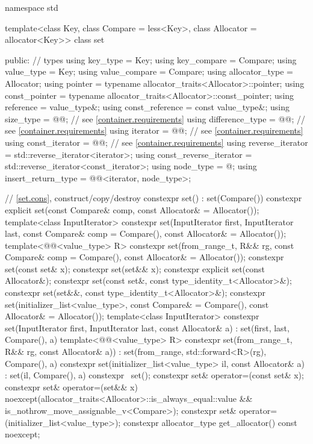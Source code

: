 \begin{codeblock}
namespace std {
  template<class Key, class Compare = less<Key>,
           class Allocator = allocator<Key>>
  class set {
  public:
    // types
    using key_type               = Key;
    using key_compare            = Compare;
    using value_type             = Key;
    using value_compare          = Compare;
    using allocator_type         = Allocator;
    using pointer                = typename allocator_traits<Allocator>::pointer;
    using const_pointer          = typename allocator_traits<Allocator>::const_pointer;
    using reference              = value_type&;
    using const_reference        = const value_type&;
    using size_type              = @@; // see \ref{container.requirements}
    using difference_type        = @@; // see \ref{container.requirements}
    using iterator               = @@; // see \ref{container.requirements}
    using const_iterator         = @@; // see \ref{container.requirements}
    using reverse_iterator       = std::reverse_iterator<iterator>;
    using const_reverse_iterator = std::reverse_iterator<const_iterator>;
    using node_type              = @\unspec@;
    using insert_return_type     = @@<iterator, node_type>;

    // \ref{set.cons}, construct/copy/destroy
    constexpr set() : set(Compare()) { }
    constexpr explicit set(const Compare& comp, const Allocator& = Allocator());
    template<class InputIterator>
      constexpr set(InputIterator first, InputIterator last,
                    const Compare& comp = Compare(), const Allocator& = Allocator());
    template<@@<value_type> R>
      constexpr set(from_range_t, R&& rg,
                    const Compare& comp = Compare(), const Allocator& = Allocator());
    constexpr set(const set& x);
    constexpr set(set&& x);
    constexpr explicit set(const Allocator&);
    constexpr set(const set&, const type_identity_t<Allocator>&);
    constexpr set(set&&, const type_identity_t<Allocator>&);
    constexpr set(initializer_list<value_type>,
                  const Compare& = Compare(), const Allocator& = Allocator());
    template<class InputIterator>
      constexpr set(InputIterator first, InputIterator last, const Allocator& a)
        : set(first, last, Compare(), a) { }
    template<@@<value_type> R>
      constexpr set(from_range_t, R&& rg, const Allocator& a))
        : set(from_range, std::forward<R>(rg), Compare(), a) { }
    constexpr set(initializer_list<value_type> il, const Allocator& a)
      : set(il, Compare(), a) { }
    constexpr ~set();
    constexpr set& operator=(const set& x);
    constexpr set& operator=(set&& x)
      noexcept(allocator_traits<Allocator>::is_always_equal::value &&
               is_nothrow_move_assignable_v<Compare>);
    constexpr set& operator=(initializer_list<value_type>);
    constexpr allocator_type get_allocator() const noexcept;

}}
\end{codeblock}
